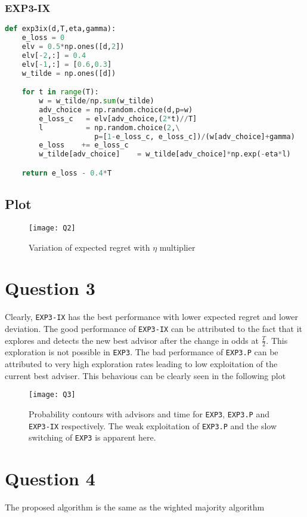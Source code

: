 \documentclass{article}
\begin{document}
\subsubsection*{EXP3-IX}
\begin{lstlisting}[language=python]
def exp3ix(d,T,eta,gamma):
    e_loss = 0
    elv = 0.5*np.ones([d,2])
    elv[-2,:] = 0.4
    elv[-1,:] = [0.6,0.3] 
    w_tilde = np.ones([d])

    for t in range(T):
        w = w_tilde/np.sum(w_tilde)
        adv_choice = np.random.choice(d,p=w)
        e_loss_c   = elv[adv_choice,(2*t)//T]
        l          = np.random.choice(2,\
                     p=[1-e_loss_c, e_loss_c])/(w[adv_choice]+gamma)
        e_loss    += e_loss_c
        w_tilde[adv_choice]    = w_tilde[adv_choice]*np.exp(-eta*l)

    return e_loss - 0.4*T
\end{lstlisting}
\subsection*{Plot}
\begin{figure}[h!]
\centering
\texttt{[image: Q2]}
\caption{Variation of expected regret with $\eta$ multiplier}
\end{figure}
\newpage
\section*{Question 3}
Clearly, \verb|EXP3-IX| has the best performance with lower expected regret and lower deviation. The good performance of \verb|EXP3-IX| can be attributed to the fact that it explores and detects the new best advisor after the change in odds at $\frac{T}{2}$. This exploration is not possible in \verb|EXP3|. The bad performance of \verb|EXP3.P| can be attributed to very high exploration rates leading to low exploitation of the current best adviser. This behavious can be clearly seen in the following plot

\begin{figure}[h!]
\centering
\texttt{[image: Q3]}
    \caption{Probability contours with advisors and time for \texttt{EXP3}, \texttt{EXP3.P} and \texttt{EXP3-IX} respectively. The weak exploitation of \texttt{EXP3.P} and the slow switching of \texttt{EXP3} is apparent here.}
\end{figure}
\newpage
\section*{Question 4 \cite{ben2009agnostic}}
The proposed algorithm is the same as the wighted majority algorithm
\end{document}
